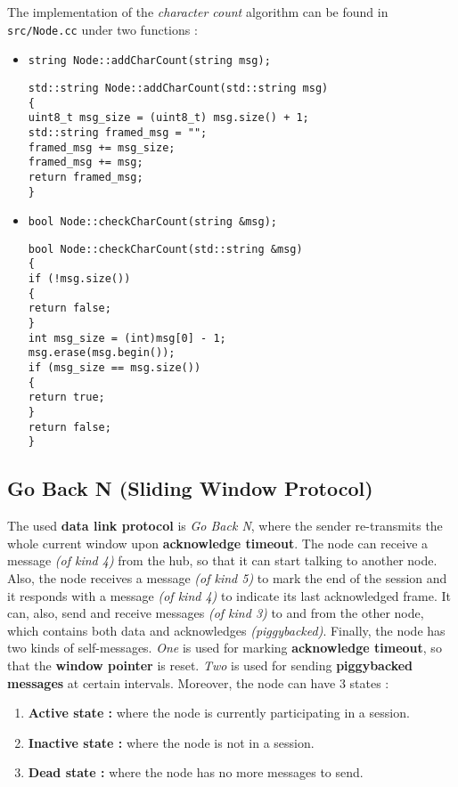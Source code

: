 The implementation of the \emph{character count} algorithm can be found in \texttt{src/Node.cc} under two functions :
\begin{itemize}
    \item \texttt{string Node::addCharCount(string msg);}
    \begin{verbatim}
std::string Node::addCharCount(std::string msg)
{
uint8_t msg_size = (uint8_t) msg.size() + 1;
std::string framed_msg = "";
framed_msg += msg_size;
framed_msg += msg;
return framed_msg;
}
    \end{verbatim}
    \item \texttt{bool Node::checkCharCount(string \&msg);}
    \begin{verbatim}
bool Node::checkCharCount(std::string &msg)
{
if (!msg.size())
{
return false;
}
int msg_size = (int)msg[0] - 1;
msg.erase(msg.begin());
if (msg_size == msg.size())
{
return true;
}
return false;
}
    \end{verbatim}
\end{itemize}

\subsection{Go Back N (Sliding Window Protocol)}
The used \textbf{data link protocol} is \emph{Go Back N}, where the sender re-transmits the whole current window upon \textbf{acknowledge timeout}. The node can receive a message \emph{(of kind 4)} from the hub, so that it can start talking to another node. Also, the node receives a message \emph{(of kind 5)} to mark the end of the session and it responds with a message \emph{(of kind 4)} to indicate its last acknowledged frame. It can, also, send and receive messages \emph{(of kind 3)} to and from the other node, which contains both data and acknowledges \emph{(piggybacked)}. Finally, the node has two kinds of self-messages. \emph{One} is used for marking \textbf{acknowledge timeout}, so that the \textbf{window pointer} is reset. \emph{Two} is used for sending \textbf{piggybacked messages} at certain intervals. Moreover, the node can have $3$ states :
\begin{enumerate}
    \item \textbf{Active state :} where the node is currently participating in a session.
    \item \textbf{Inactive state :} where the node is not in a session.
    \item \textbf{Dead state :} where the node has no more messages to send.
\end{enumerate}


